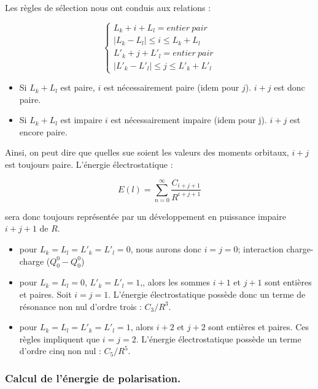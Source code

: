 Les règles de sélection nous ont conduis aux relations :
	
\begin{equation}
	\begin{cases}
	L_{k} + i + L_{l} = entier\ pair \\
	|L_{k} - L_{l}| \leq i \leq L_{k} + L_{l} \\
	L'_{k} + j + L'_{l} = entier\ pair \\
	|L'_{k} - L'_{l}| \leq j \leq L'_{k} + L'_{l}
	\end{cases}
\end{equation}
		
\begin{itemize}
	\item Si $L_{k} + L_{l}$ est paire, $i$ est nécessairement paire (idem pour $j$). $i + j$ est donc paire.	
	\item Si $L_{k} + L_{l}$ est impaire $i$ est nécessairement impaire (idem pour j). $i + j$ est encore paire.
\end{itemize}
		
Ainsi, on peut dire que quelles sue soient les valeurs des moments orbitaux, $i + j$ est toujours paire. L'énergie électrostatique : 
	
\begin{equation}
E(l) = \sum_{n=0}^{\infty} \frac{C_{i+j+1}}{R^{i+j+1}}
\end{equation}
	
sera donc toujours représentée par un développement en puissance impaire $i+ j + 1$ de $R$.

\begin{itemize}
	\item pour $L_{k} = L_{l} = L'_{k} = L'_{l} = 0$, nous aurons donc $i = j = 0$; interaction charge-charge ($Q_{0}^{0}- Q_{0}^{0}$)	
	\item pour $L_{k} = L_{l} = 0$, $L'_{k} = L'_{l} = 1$,, alors les sommes $i + 1$ et $j + 1$ sont entières et paires. Soit $i = j = 1$. L'énergie électrostatique possède donc un terme de résonance non nul d'ordre trois : $C_{3}/R^{3}$.
	\item pour $L_{k} = L_{l} = L'_{k} = L'_{l} = 1$, alors $i + 2$ et $j + 2$ sont entières et paires. Ces règles impliquent que $i = j = 2$. L'énergie électrostatique possède un terme d'ordre cinq non nul : $C_{5}/R^{5}$.
\end{itemize}


\subsubsection{Calcul de l’énergie de polarisation.}

